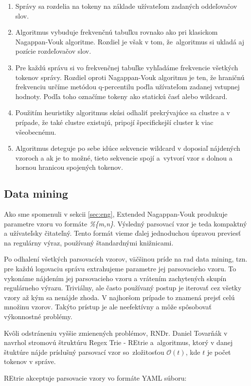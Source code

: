 \begin{enumerate}
 \item Správy sa rozdelia na tokeny na základe užívateľom zadaných oddeľovačov slov.
 \item Algoritmus vybuduje frekvenčnú tabuľku rovnako ako pri klasickom Nagappan-Vouk algoritme. Rozdiel je však v tom, že~algoritmus si ukladá aj pozície rozdeľovačov slov.
 \item Pre každú správu si vo frekvenčnej tabuľke vyhľadáme frekvencie všetkých tokenov správy. Rozdiel oproti Nagappan-Vouk algoritmu je ten, že hraničnú frekvenciu určíme metódou q-per\-centilu poďla užívateľom zadanej vstupnej hodnoty. Podľa toho označíme tokeny ako statickú časť alebo wildcard.
 \item Použitím heuristiky algoritmus skúsi odhaliť prekrývajúce sa clustre a v prípade, že také clustre existujú, pripojí špecifickejší cluster k viac všeobecnému.
 \item Algoritmus deteguje po sebe idúce sekvencie wildcard v doposiaľ nájdených vzoroch a ak je to možné, tieto sekvencie spojí a~vytvorí
 vzor s dolnou a hornou hranicou spojených tokenov.
\end{enumerate}

\subsection{Data mining}
\label{sec:data-mining}
Ako sme spomenuli v sekcii \ref{sec:eng}, Extended Nagappan-Vouk produkuje parametre vzoru vo formáte \emph{\%\{m,n\}}. Výsledný parsovací vzor je teda kompaktný a užívateľsky čitateľný.  Tento formát vieme ďalej jednoduchou úpravou previesť na regulárny výraz, používaný štandardnými knižnicami.
\par Po odhalení všetkých parsovacích vzorov, väčšinou príde na rad data mining, tzn. pre každú logovaciu správu extrahujeme parametre jej parsovacieho vzoru. To vykonáme nájdením jej parsovacieho vzoru a vrátením zachytených skupín regulárneho výrazu. Triviálny, ale často používaný postup je iterovať cez všetky vzory až kým sa nenájde zhoda. V najhoršom prípade to znamená prejsť celú množinu vzorov. Takýto prístup je ale neefektívny a môže spôsobovať výkonnostné problémy.
\par Kvôli odstráneniu vyššie zmienených problémov, RNDr. Daniel Tovarňák v \parencite{regextrie} navrhol stromovú štruktúru Regex Trie - REtrie a~algoritmus, ktorý v danej štuktúre nájde príslušný parsovací vzor so~zložitosťou $\mathcal{O}(t)$, kde $t$ je počet tokenov v správe.
\par REtrie akceptuje parsovacie vzory vo formáte YAML súboru:

